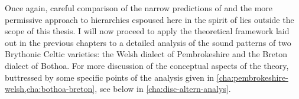 Once again, careful comparison of the narrow predictions of \citet{delacy2006} and the more permissive approach to hierarchies espoused here in the spirit of \citet{rice03:_featur,rice07:_marked} lies outside the scope of this thesis. I will now proceed to apply the theoretical framework laid out in the previous chapters to a detailed analysis of the sound patterns of two Brythonic Celtic varieties: the Welsh dialect of Pembrokeshire and the Breton dialect of Bothoa. For more discussion of the conceptual aspects of the theory, buttressed by some specific points of the analysis given in \cref{cha:pembrokeshire-welsh,cha:bothoa-breton}, see below in \cref{cha:disc-altern-analys}.

